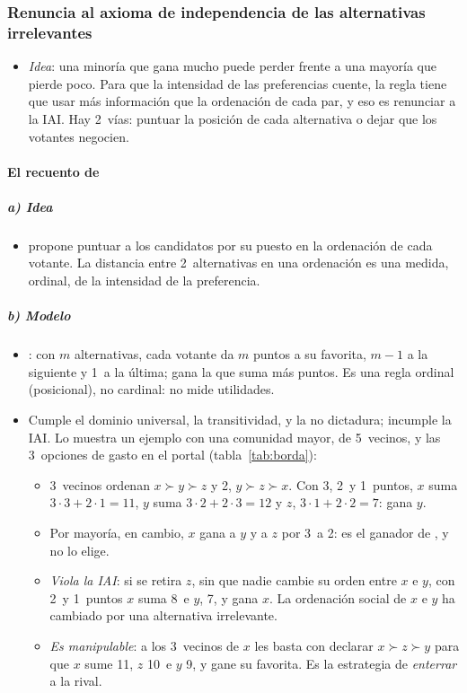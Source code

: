 \documentclass[11pt]{article}
\begin{document}
\subsubsection{Renuncia al axioma de independencia de las alternativas irrelevantes}\label{sec:renuncia-iai}

\begin{itemize}
\item \emph{Idea}: una minoría que gana mucho puede perder frente a una mayoría que pierde poco. Para que la intensidad de las preferencias cuente, la regla tiene que usar más información que la ordenación de cada par, y eso es renunciar a la IAI. Hay 2~vías: puntuar la posición de cada alternativa o dejar que los votantes negocien.
\end{itemize}

\paragraph{El recuento de }

\subparagraph{a) Idea}

\begin{itemize}
\item \textcite{Borda1781Memoire} propone puntuar a los candidatos por su puesto en la ordenación de cada votante. La distancia entre 2~alternativas en una ordenación es una medida, ordinal, de la intensidad de la preferencia.
\end{itemize}

\subparagraph{b) Modelo}

\begin{itemize}
\item {}: con $m$ alternativas, cada votante da $m$ puntos a su favorita, $m-1$ a la siguiente y 1~a la última; gana la que suma más puntos. Es una regla ordinal (posicional), no cardinal: no mide utilidades.
\item Cumple el dominio universal, la transitividad,  y la no dictadura; incumple la IAI. Lo muestra un ejemplo con una comunidad mayor, de 5~vecinos, y las 3~opciones de gasto en el portal (tabla~\ref{tab:borda}):
  \begin{itemize}
  \item 3~vecinos ordenan $x\succ y\succ z$ y 2, $y\succ z\succ x$. Con 3, 2~y 1~puntos, $x$ suma $3\cdot3+2\cdot1=11$, $y$ suma $3\cdot2+2\cdot3=12$ y $z$, $3\cdot1+2\cdot2=7$: gana $y$.
  \item Por mayoría, en cambio, $x$ gana a $y$ y a $z$ por 3~a 2: es el ganador de , y  no lo elige.
  \item \emph{Viola la IAI}: si se retira $z$, sin que nadie cambie su orden entre $x$ e $y$, con 2~y 1~puntos $x$ suma 8~e $y$, 7, y gana $x$. La ordenación social de $x$ e $y$ ha cambiado por una alternativa irrelevante.
  \item \emph{Es manipulable}: a los 3~vecinos de $x$ les basta con declarar $x\succ z\succ y$ para que $x$ sume 11, $z$ 10~e $y$ 9, y gane su favorita. Es la estrategia de \emph{enterrar} a la rival.
  \end{itemize}
\end{itemize}
\end{document}
